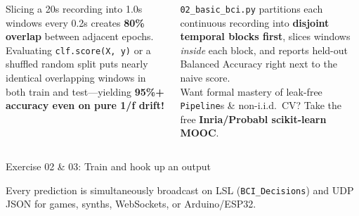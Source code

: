 \documentclass[aspectratio=169,11pt,t]{beamer}
\begin{document}
\begin{NTXSandFrame}
  \begin{columns}[T,onlytextwidth]
      {\NTXSans\scriptsize\color{NTXInk}
        Slicing a 20s recording into 1.0s windows every 0.2s creates \textbf{80\% overlap} between adjacent epochs.\\[2mm]
        Evaluating \texttt{clf.score(X, y)} or a shuffled random split puts nearly identical overlapping windows in both train and test---yielding \textbf{95\%+ accuracy even on pure 1/f drift!}
      \par}
      {\NTXSans\scriptsize\color{NTXInk}
        \texttt{02\_basic\_bci.py} partitions each continuous recording into \textbf{disjoint temporal blocks first}, slices windows \emph{inside} each block, and reports held-out Balanced Accuracy right next to the naive score.\\[2mm]
        Want formal mastery of leak-free \texttt{Pipeline}s \& non-i.i.d.\ CV? Take the free \textbf{Inria/Probabl scikit-learn MOOC}.
      \par}
  \end{columns}
\end{NTXSandFrame}

\begin{frame}{Exercise 02 \& 03: Train and hook up an output}
  {\NTXSans\scriptsize\color{NTXMuted}Every prediction is simultaneously broadcast on LSL (\texttt{BCI\_Decisions}) and UDP JSON for games, synths, WebSockets, or Arduino/ESP32.\par}
\end{frame}
\end{document}
